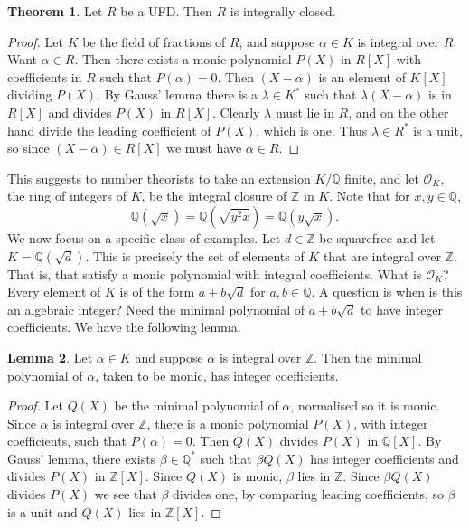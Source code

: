 \documentclass{article}
\newcommand{\Z}{\mathbb{Z}}
\newcommand{\Q}{\mathbb{Q}}
\newcommand{\rb}[1]{\left( #1 \right)}
\renewcommand{\sb}[1]{\left[ #1 \right]}
\theoremstyle{definition}\newtheorem{definition}{Definition}[subsection]
\theoremstyle{definition}\newtheorem{remark}[definition]{Remark}
\theoremstyle{definition}\newtheorem*{example}{Example}
\theoremstyle{definition}\newtheorem*{note}{Note}
\newtheorem{lemma}[definition]{Lemma}
\newtheorem{theorem}[definition]{Theorem}
\begin{document}
\begin{theorem}
Let $ R $ be a UFD. Then $ R $ is integrally closed.
\end{theorem}

\begin{proof}
Let $ K $ be the field of fractions of $ R $, and suppose $ \alpha \in K $ is integral over $ R $. Want $ \alpha \in R $. Then there exists a monic polynomial $ P\rb{X} $ in $ R\sb{X} $ with coefficients in $ R $ such that $ P\rb{\alpha} = 0 $. Then $ \rb{X - \alpha} $ is an element of $ K\sb{X} $ dividing $ P\rb{X} $. By Gauss' lemma there is a $ \lambda \in K^* $ such that $ \lambda\rb{X - \alpha} $ is in $ R\sb{X} $ and divides $ P\rb{X} $ in $ R\sb{X} $. Clearly $ \lambda $ must lie in $ R $, and on the other hand divide the leading coefficient of $ P\rb{X} $, which is one. Thus $ \lambda \in R^* $ is a unit, so since $ \rb{X - \alpha} \in R\sb{X} $ we must have $ \alpha \in R $.
\end{proof}

This suggests to number theorists to take an extension $ K / \Q $ finite, and let $ \mathcal{O}_K $, the ring of integers of $ K $, be the integral closure of $ \Z $ in $ K $. Note that for $ x, y \in \Q $,
$$ \Q\rb{\sqrt{x}} = \Q\rb{\sqrt{y^2x}} = \Q\rb{y\sqrt{x}}. $$
We now focus on a specific class of examples. Let $ d \in \Z $ be squarefree and let $ K = \Q\rb{\sqrt{d}} $. This is precisely the set of elements of $ K $ that are integral over $ \Z $. That is, that satisfy a monic polynomial with integral coefficients. What is $ \mathcal{O}_K $? Every element of $ K $ is of the form $ a + b\sqrt{d} $ for $ a, b \in \Q $. A question is when is this an algebraic integer? Need the minimal polynomial of $ a + b\sqrt{d} $ to have integer coefficients. We have the following lemma.

\begin{lemma}
Let $ \alpha \in K $ and suppose $ \alpha $ is integral over $ \Z $. Then the minimal polynomial of $ \alpha $, taken to be monic, has integer coefficients.
\end{lemma}

\begin{proof}
Let $ Q\rb{X} $ be the minimal polynomial of $ \alpha $, normalised so it is monic. Since $ \alpha $ is integral over $ \Z $, there is a monic polynomial $ P\rb{X} $, with integer coefficients, such that $ P\rb{\alpha} = 0 $. Then $ Q\rb{X} $ divides $ P\rb{X} $ in $ \Q\sb{X} $. By Gauss' lemma, there exists $ \beta \in \Q^* $ such that $ \beta Q\rb{X} $ has integer coefficients and divides $ P\rb{X} $ in $ \Z\sb{X} $. Since $ Q\rb{X} $ is monic, $ \beta $ lies in $ \Z $. Since $ \beta Q\rb{X} $ divides $ P\rb{X} $ we see that $ \beta $ divides one, by comparing leading coefficients, so $ \beta $ is a unit and $ Q\rb{X} $ lies in $ \Z\sb{X} $.
\end{proof}
\end{document}
